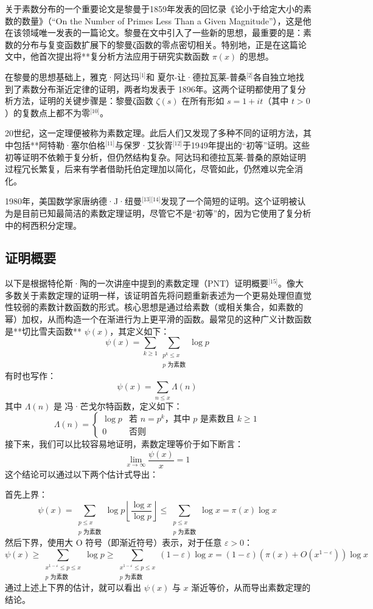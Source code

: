 关于素数分布的一个重要论文是黎曼于1859年发表的回忆录《论小于给定大小的素数的数量》（“On the Number of Primes Less Than a Given Magnitude”），这是他在该领域唯一发表的一篇论文。黎曼在文中引入了一些新的思想，最重要的是：素数的分布与复变函数扩展下的黎曼ζ函数的零点密切相关。特别地，正是在这篇论文中，他首次提出将**复分析方法应用于研究实数函数 $\pi(x)$ 的思想。

在黎曼的思想基础上，雅克·阿达玛\(^\text{[1]}\)和 夏尔-让·德拉瓦莱-普桑\(^\text{[2]}\)各自独立地找到了素数分布渐近定律的证明，两者均发表于 1896年。这两个证明都使用了复分析方法，证明的关键步骤是：黎曼ζ函数 $\zeta(s)$ 在所有形如 $s = 1 + it$（其中 $t > 0$）的复数点上都不为零\(^\text{[10]}\)。

20世纪，这一定理便被称为素数定理。此后人们又发现了多种不同的证明方法，其中包括**阿特勒·塞尔伯格\(^\text{[11]}\)与保罗·艾狄胥\(^\text{[12]}\)于1949年提出的“初等”证明。这些初等证明不依赖于复分析，但仍然结构复杂。阿达玛和德拉瓦莱-普桑的原始证明过程冗长繁复，后来有学者借助托伯定理加以简化，尽管如此，仍然难以完全消化。

1980年，美国数学家唐纳德·J·纽曼\(^\text{[13][14]}\)发现了一个简短的证明。这个证明被认为是目前已知最简洁的素数定理证明，尽管它不是“初等”的，因为它使用了复分析中的柯西积分定理。
\subsection{证明概要}
以下是根据特伦斯·陶的一次讲座中提到的素数定理（PNT）证明概要\(^\text{[15]}\)。像大多数关于素数定理的证明一样，该证明首先将问题重新表述为一个更易处理但直觉性较弱的素数计数函数的形式。核心思想是通过给素数（或相关集合，如素数的幂）加权，从而构造一个在渐进行为上更平滑的函数。最常见的这种广义计数函数是**切比雪夫函数** $\psi(x)$，其定义如下：
$$
\psi(x) = \sum_{k \geq 1} \sum_{\substack{p^k \leq x\\ p \text{ 为素数}}} \log p~
$$
有时也写作：
$$
\psi(x) = \sum_{n \leq x} \Lambda(n)~
$$
其中 $\Lambda(n)$ 是 冯·芒戈尔特函数，定义如下：
$$
\Lambda(n) =
\begin{cases}
\log p & \text{若 } n = p^k \text{，其中 } p \text{ 是素数且 } k \geq 1 \\
0 & \text{否则}
\end{cases}~
$$
接下来，我们可以比较容易地证明，素数定理等价于如下断言：
$$
\lim_{x \to \infty} \frac{\psi(x)}{x} = 1~
$$
这个结论可以通过以下两个估计式导出：

首先上界：
$$
\psi(x) = \sum_{\substack{p \leq x \\ p \text{ 为素数}}} \log p \left\lfloor \frac{\log x}{\log p} \right\rfloor \leq \sum_{\substack{p \leq x \\ p \text{ 为素数}}} \log x = \pi(x) \log x~
$$
然后下界，使用大 O 符号（即渐近符号）表示，对于任意 $\varepsilon > 0$：
$$
\psi(x) \geq \sum_{\substack{x^{1-\varepsilon} \leq p \leq x \\ p \text{ 为素数}}} \log p \geq \sum_{\substack{x^{1-\varepsilon} \leq p \leq x \\ p \text{ 为素数}}} (1 - \varepsilon)\log x = (1 - \varepsilon)\left(\pi(x) + O(x^{1-\varepsilon})\right)\log x~
$$
通过上述上下界的估计，就可以看出 $\psi(x)$ 与 $x$ 渐近等价，从而导出素数定理的结论。

